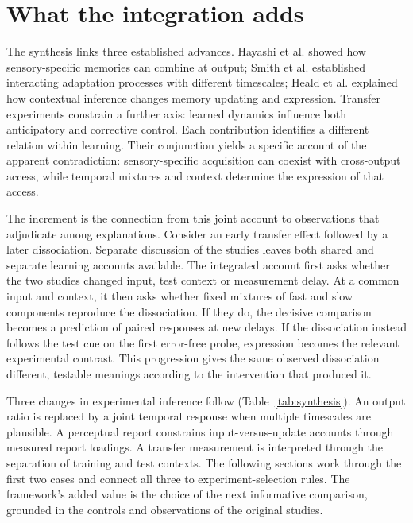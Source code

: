 \documentclass[11pt,a4paper]{article}
\begin{document}
\section{What the integration adds}
The synthesis links three established advances. Hayashi et al. showed how sensory-specific memories can combine at output; Smith et al. established interacting adaptation processes with different timescales; Heald et al. explained how contextual inference changes memory updating and expression. Transfer experiments constrain a further axis: learned dynamics influence both anticipatory and corrective control. Each contribution identifies a different relation within learning. Their conjunction yields a specific account of the apparent contradiction: sensory-specific acquisition can coexist with cross-output access, while temporal mixtures and context determine the expression of that access. \cite{hayashi2020,smith2006,coin2021,wagner2008,maeda2020}

The increment is the connection from this joint account to observations that adjudicate among explanations. Consider an early transfer effect followed by a later dissociation. Separate discussion of the studies leaves both shared and separate learning accounts available. The integrated account first asks whether the two studies changed input, test context or measurement delay. At a common input and context, it then asks whether fixed mixtures of fast and slow components reproduce the dissociation. If they do, the decisive comparison becomes a prediction of paired responses at new delays. If the dissociation instead follows the test cue on the first error-free probe, expression becomes the relevant experimental contrast. This progression gives the same observed dissociation different, testable meanings according to the intervention that produced it.

Three changes in experimental inference follow (Table~\ref{tab:synthesis}). An output ratio is replaced by a joint temporal response when multiple timescales are plausible. A perceptual report constrains input-versus-update accounts through measured report loadings. A transfer measurement is interpreted through the separation of training and test contexts. The following sections work through the first two cases and connect all three to experiment-selection rules. The framework's added value is the choice of the next informative comparison, grounded in the controls and observations of the original studies.
\end{document}
